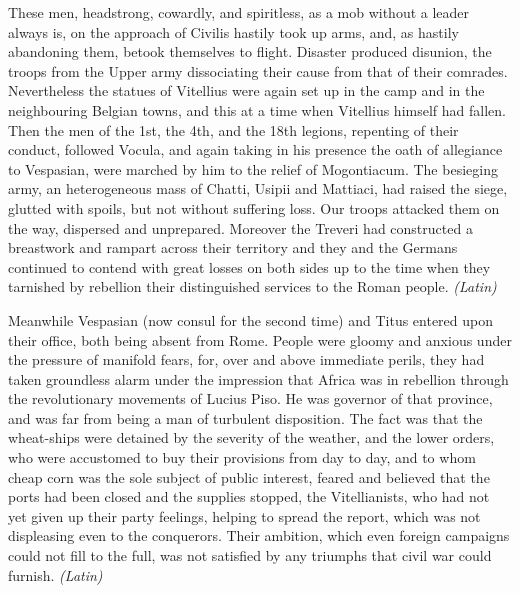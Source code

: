 
These men, headstrong, cowardly, and spiritless, as a mob without a leader always is, on the approach of Civilis hastily took up arms, and, as hastily abandoning them, betook themselves to flight. Disaster produced disunion, the troops from the Upper army dissociating their cause from that of their comrades. Nevertheless the statues of Vitellius were again set up in the camp and in the neighbouring Belgian towns, and this at a time when Vitellius himself had fallen. Then the men of the 1st, the 4th, and the 18th legions, repenting of their conduct, followed Vocula, and again taking in his presence the oath of allegiance to Vespasian, were marched by him to the relief of Mogontiacum. The besieging army, an heterogeneous mass of Chatti, Usipii and Mattiaci, had raised the siege, glutted with spoils, but not without suffering loss. Our troops attacked them on the way, dispersed and unprepared. Moreover the Treveri had constructed a breastwork and rampart across their territory and they and the Germans continued to contend with great losses on both sides up to the time when they tarnished by rebellion their distinguished services to the Roman people. \emph{(Latin)}


Meanwhile Vespasian (now consul for the second time) and Titus entered upon their office, both being absent from Rome. People were gloomy and anxious under the pressure of manifold fears, for, over and above immediate perils, they had taken groundless alarm under the impression that Africa was in rebellion through the revolutionary movements of Lucius Piso. He was governor of that province, and was far from being a man of turbulent disposition. The fact was that the wheat-ships were detained by the severity of the weather, and the lower orders, who were accustomed to buy their provisions from day to day, and to whom cheap corn was the sole subject of public interest, feared and believed that the ports had been closed and the supplies stopped, the Vitellianists, who had not yet given up their party feelings, helping to spread the report, which was not displeasing even to the conquerors. Their ambition, which even foreign campaigns could not fill to the full, was not satisfied by any triumphs that civil war could furnish. \emph{(Latin)}


